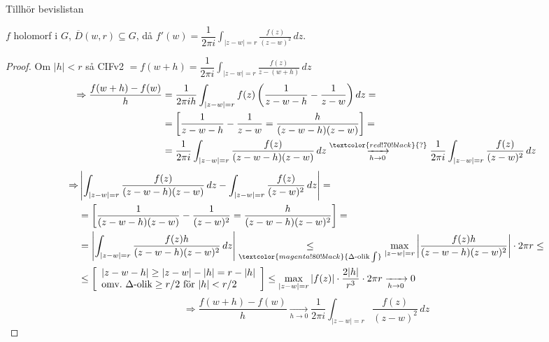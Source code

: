 \begin{theorem}
\hfill \textcolor{magenta!80!black}{Tillhör bevislistan}

$f$ holomorf i $G$, $\overline{D}(w, r) \subseteq G$, då $f'(w) = \dfrac{1}{2\pi i} \displaystyle\int_{|z - w| = r} \frac{f(z)}{(z - w)^2}\,dz$.
\end{theorem}
\begin{proof}
Om $|h| < r$ så CIFv2 $= f(w + h) = \dfrac{1}{2\pi i} \displaystyle\int_{|z - w| = r} \frac{f(z)}{z - (w + h)}\,dz$
\begin{align*}
  \Rightarrow \frac{f(w + h) - f(w)}{h} &= \frac{1}{2\pi i h} \int_{|z - w| = r} f(z)\left( \frac{1}{z - w - h} - \frac{1}{z - w} \right) dz = \\
  &= \left[ \frac{1}{z - w - h} - \frac{1}{z - w} = \frac{h}{(z - w - h)(z - w)} \right] = \\
  &= \frac{1}{2\pi i} \int_{|z - w| = r} \frac{f(z)}{(z - w - h)(z - w)}\,dz \overset{\textcolor{red!70!black}{?}}{\xrightarrow[h \to 0]{}} \frac{1}{2\pi i} \int_{|z - w| = r} \frac{f(z)}{(z - w)^2}\,dz
\end{align*}
\begin{align*}
  \Rightarrow &\left| \int_{|z - w| = r} \frac{f(z)}{(z - w - h)(z - w)}\,dz - \int_{|z - w| = r} \frac{f(z)}{(z - w)^2}\,dz \right| = \\
  &= \left[ \frac{1}{(z - w - h)(z - w)} - \frac{1}{(z - w)^2} = \frac{h}{(z - w - h)(z - w)^2} \right] = \\
  &= \left| \int_{|z - w| = r} \frac{f(z)h}{(z - w - h)(z - w)^2}\,dz \right| \underset{\textcolor{magenta!80!black}{\Delta\text{-olik} \int}}{\le} \max_{|z - w| = r} \left| \frac{f(z)h}{(z - w - h)(z - w)^2} \right| \cdot 2\pi r \le \\
  &\le \left[ \begin{array}{l} |z - w - h| \ge |z - w| - |h| = r - |h| \\ \text{omv.\ } \Delta\text{-olik} \ge r/2 \text{ för } |h| < r/2 \end{array} \right] \le \max_{|z - w| = r} |f(z)| \cdot \frac{2|h|}{r^3} \cdot 2\pi r \xrightarrow[h \to 0]{} 0
\end{align*}
\[ \Rightarrow \frac{f(w + h) - f(w)}{h} \xrightarrow[h \to 0]{} \frac{1}{2\pi i} \int_{|z - w| = r} \frac{f(z)}{(z - w)^2}\,dz \]
\end{proof}
